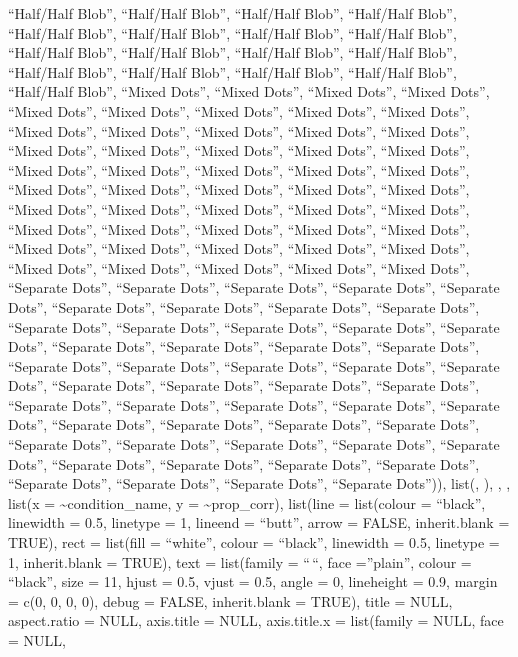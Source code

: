 \documentclass[
  man,floatsintext]{apa6}
\begin{document}
``Half/Half Blob'', ``Half/Half Blob'', ``Half/Half Blob'', ``Half/Half Blob'', ``Half/Half Blob'', ``Half/Half Blob'', ``Half/Half Blob'', ``Half/Half Blob'', ``Half/Half Blob'', ``Half/Half Blob'', ``Half/Half Blob'', ``Half/Half Blob'', ``Half/Half Blob'', ``Half/Half Blob'', ``Half/Half Blob'', ``Half/Half Blob'', ``Half/Half Blob'', ``Mixed Dots'', ``Mixed Dots'', ``Mixed Dots'', ``Mixed Dots'', ``Mixed Dots'', ``Mixed Dots'', ``Mixed Dots'', ``Mixed Dots'', ``Mixed Dots'', ``Mixed Dots'', ``Mixed Dots'', ``Mixed Dots'', ``Mixed Dots'', ``Mixed Dots'',
``Mixed Dots'', ``Mixed Dots'', ``Mixed Dots'', ``Mixed Dots'', ``Mixed Dots'', ``Mixed Dots'', ``Mixed Dots'', ``Mixed Dots'', ``Mixed Dots'', ``Mixed Dots'', ``Mixed Dots'', ``Mixed Dots'', ``Mixed Dots'', ``Mixed Dots'', ``Mixed Dots'', ``Mixed Dots'', ``Mixed Dots'', ``Mixed Dots'', ``Mixed Dots'', ``Mixed Dots'', ``Mixed Dots'', ``Mixed Dots'', ``Mixed Dots'', ``Mixed Dots'', ``Mixed Dots'', ``Mixed Dots'', ``Mixed Dots'', ``Mixed Dots'', ``Mixed Dots'', ``Mixed Dots'', ``Mixed Dots'', ``Mixed Dots'', ``Mixed Dots'', ``Mixed Dots'', ``Mixed Dots'', ``Separate Dots'',
``Separate Dots'', ``Separate Dots'', ``Separate Dots'', ``Separate Dots'', ``Separate Dots'', ``Separate Dots'', ``Separate Dots'', ``Separate Dots'', ``Separate Dots'', ``Separate Dots'', ``Separate Dots'', ``Separate Dots'', ``Separate Dots'', ``Separate Dots'', ``Separate Dots'', ``Separate Dots'', ``Separate Dots'', ``Separate Dots'', ``Separate Dots'', ``Separate Dots'', ``Separate Dots'', ``Separate Dots'', ``Separate Dots'', ``Separate Dots'', ``Separate Dots'', ``Separate Dots'', ``Separate Dots'', ``Separate Dots'', ``Separate Dots'', ``Separate Dots'',
``Separate Dots'', ``Separate Dots'', ``Separate Dots'', ``Separate Dots'', ``Separate Dots'', ``Separate Dots'', ``Separate Dots'', ``Separate Dots'', ``Separate Dots'', ``Separate Dots'', ``Separate Dots'', ``Separate Dots'', ``Separate Dots'', ``Separate Dots'', ``Separate Dots'', ``Separate Dots'', ``Separate Dots'', ``Separate Dots'')), list(, ), , , list(x = \textasciitilde condition\_name, y = \textasciitilde prop\_corr), list(line = list(colour = ``black'', linewidth = 0.5, linetype = 1, lineend = ``butt'', arrow = FALSE, inherit.blank = TRUE), rect = list(fill = ``white'', colour = ``black'', linewidth = 0.5, linetype = 1, inherit.blank = TRUE), text = list(family = ``\,``, face =''plain'', colour = ``black'', size = 11, hjust = 0.5, vjust = 0.5, angle = 0, lineheight = 0.9, margin = c(0, 0, 0, 0), debug = FALSE, inherit.blank = TRUE), title = NULL, aspect.ratio = NULL, axis.title = NULL, axis.title.x = list(family = NULL, face = NULL,
\end{document}
